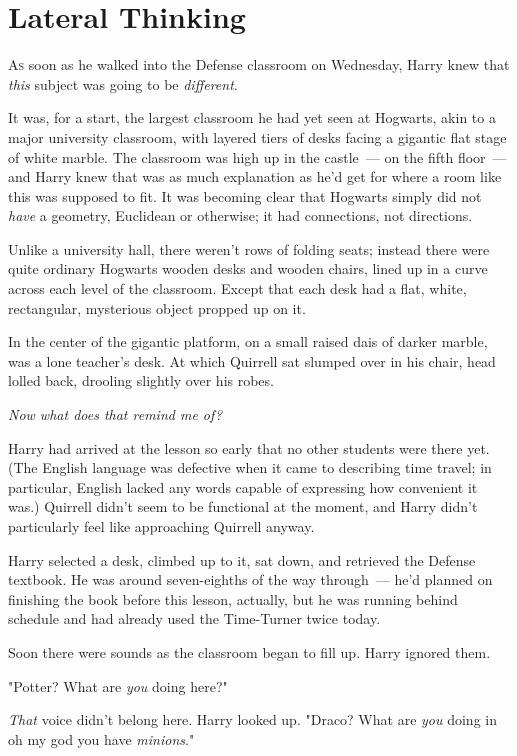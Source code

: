\chapter{Lateral Thinking}

\lettrine{A}{s} soon as he walked into the Defense classroom on Wednesday, Harry knew that
\emph{this} subject was going to be \emph{different}.

It was, for a start, the largest classroom he had yet seen at Hogwarts, akin to
a major university classroom, with layered tiers of desks facing a gigantic
flat stage of white marble. The classroom was high up in the castle~--- on the
fifth floor~--- and Harry knew that was as much explanation as he'd get for where
a room like this was supposed to fit. It was becoming clear that Hogwarts
simply did not \emph{have} a geometry, Euclidean or otherwise; it had
connections, not directions.

Unlike a university hall, there weren't rows of folding seats; instead there
were quite ordinary Hogwarts wooden desks and wooden chairs, lined up in a
curve across each level of the classroom. Except that each desk had a flat,
white, rectangular, mysterious object propped up on it.

In the center of the gigantic platform, on a small raised dais of darker
marble, was a lone teacher's desk. At which Quirrell sat slumped over in his
chair, head lolled back, drooling slightly over his robes.

\emph{Now what does that remind me of\el\kern\ellipsisgapitalic?}

Harry had arrived at the lesson so early that no other students were there yet.
(The English language was defective when it came to describing time travel; in
particular, English lacked any words capable of expressing how convenient it
was.) Quirrell didn't seem to be{\el} functional{\el} at the moment, and
Harry didn't particularly feel like approaching Quirrell anyway.

Harry selected a desk, climbed up to it, sat down, and retrieved the Defense
textbook. He was around seven-eighths of the way through~--- he'd planned on
finishing the book before this lesson, actually, but he was running behind
schedule and had already used the Time-Turner twice today.

Soon there were sounds as the classroom began to fill up. Harry ignored them.

"Potter? What are \emph{you} doing here?"

\emph{That} voice didn't belong here. Harry looked up. "Draco? What are
\emph{you} doing in oh my god you have \emph{minions}."

